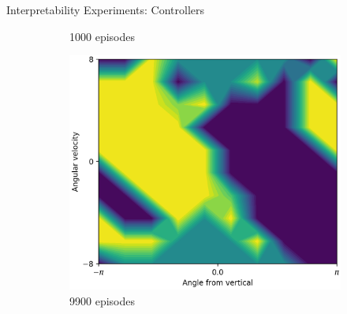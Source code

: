 \documentclass{beamer}
\begin{document}
\begin{frame}{Interpretability Experiments: Controllers}
\begin{figure}[t]
\begin{subfigure}{0.30\linewidth}
      \caption{1000 episodes}
    \end{subfigure}
    \begin{subfigure}{0.30\linewidth}
      \centering
      \includegraphics[width=0.9\linewidth,trim=0 0 0 0,clip]{assets/ref_plots/controller_refcolexps_r10c10_1_ep9900}
      \caption{9900 episodes}
    \end{subfigure}
    \begin{subfigure}{0.05\linewidth}
      \vspace{-2em}
      \centering

\end{subfigure}
\end{figure}
\end{frame}
\end{document}
